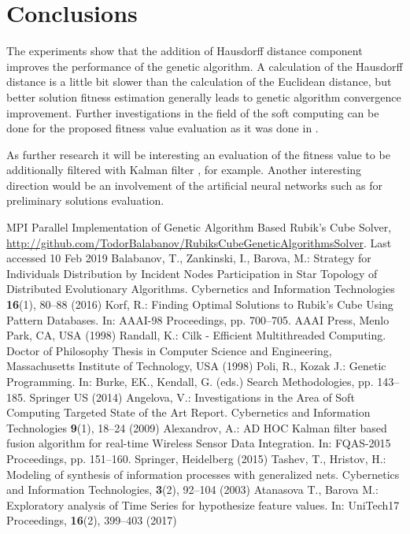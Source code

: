 \documentclass[runningheads]{llncs}
\begin{document}
\section{Conclusions}

The experiments show that the addition of Hausdorff distance component improves the performance of the genetic algorithm. A calculation of the Hausdorff distance is a little bit slower than the calculation of the Euclidean distance, but better solution fitness estimation generally leads to genetic algorithm convergence improvement. Further investigations in the field of the soft computing can be done for the proposed fitness value evaluation as it was done in \cite{angelova01}.

As further research it will be interesting an evaluation of the fitness value to be additionally filtered with Kalman filter \cite{alexandrov01}, for example. Another interesting direction would be an involvement of the artificial neural networks such as \cite{tashev01,atanasova01} for preliminary solutions evaluation.

\begin{thebibliography}{8}
MPI Parallel Implementation of Genetic Algorithm Based Rubik’s Cube Solver, \url{http://github.com/TodorBalabanov/RubiksCubeGeneticAlgorithmsSolver}. Last accessed 10 Feb 2019
Balabanov, T., Zankinski, I., Barova, M.: Strategy for Individuals Distribution by Incident Nodes Participation in Star Topology of Distributed Evolutionary Algorithms. Cybernetics and Information Technologies \textbf{16}(1), 80--88 (2016)
Korf, R.: Finding Optimal Solutions to Rubik’s Cube Using Pattern Databases. In: AAAI-98 Proceedings, pp. 700--705. AAAI Press, Menlo Park, CA, USA (1998)
Randall, K.: Cilk - Efficient Multithreaded Computing. Doctor of Philosophy Thesis in Computer Science and Engineering, Massachusetts Institute of Technology, USA (1998) 
Poli, R., Kozak J.: Genetic Programming. In: Burke, EK., Kendall, G. (eds.) Search Methodologies, pp. 143--185. Springer US (2014)
Angelova, V.: Investigations in the Area of Soft Computing Targeted State of the Art Report. Cybernetics and Information Technologies \textbf{9}(1), 18--24 (2009)
Alexandrov, A.: AD HOC Kalman filter based fusion algorithm for real-time Wireless Sensor Data Integration. In: FQAS-2015 Proceedings, pp. 151--160. Springer, Heidelberg (2015)
Tashev, T., Hristov, H.: Modeling of synthesis of information processes with generalized nets. Cybernetics and Information Technologies, \textbf{3}(2), 92--104 (2003) 
Atanasova T., Barova M.: Exploratory analysis of Time Series for hypothesize feature values. In: UniTech17 Proceedings,  \textbf{16}(2), 399--403 (2017)
\end{thebibliography}
\end{document}

